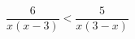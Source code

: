 \begin{ex}[type=inequality]
	\begin{condition}
		\( \dfrac{6}{x(x-3)}<\dfrac{5}{x(3-x)} \)
	\end{condition}
\end{ex}